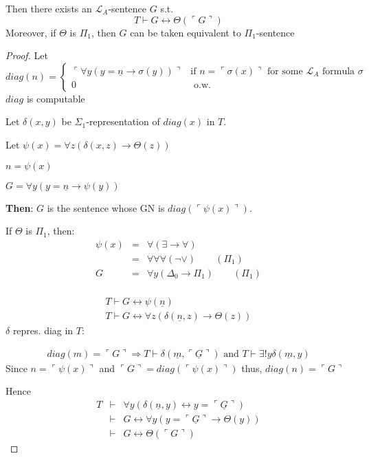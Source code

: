 \documentclass[12pt]{article}
\newcommand{\proves}{\vdash}
\newcommand{\gn}[1]{\ulcorner #1 \urcorner}
\begin{document}
Then there exists an $\mathcal{L}_A$-sentence $G$ s.t.
\[
T \proves G \leftrightarrow \Theta(\gn{G})
\]
Moreover, if $\Theta$ is $\Pi_1$, then $G$ can be taken equivalent to $\Pi_1$-sentence
\begin{proof}
  Let 
  \[
  diag(n) =
  \begin{cases}
    \gn{\forall y ( y=\underline{n} \rightarrow \sigma(y))}
   &\text{if $n = \gn{\sigma(x)}$ for some $\mathcal{L}_A$ formula $\sigma$} \\
   0 &\text{ o.w.}
  \end{cases}
  \]
  $diag$ is computable

  Let $\delta(x,y)$ be $\Sigma_1$-representation of $diag(x)$ in $T$.

  Let $\psi(x) = \forall z \left( \delta(x,z) \rightarrow \Theta(z) \right)$

  $n = \psi(x)$

  $G = \forall y \left( y = \underline{n} \rightarrow \psi(y) \right)$

  \textbf{Then}: $G$ is the sentence whose GN is $diag(\gn{\psi(x)})$.

  If $\Theta$ is $\Pi_1$, then:
  \begin{align*}
    \psi(x) &=& \forall ( \exists \rightarrow \forall) \\
            &=& \forall \forall \forall (\neg \vee) \qquad (\Pi_1) \\
            G &=&  \forall y ( \Delta_0 \rightarrow \Pi_1) \qquad (\Pi_1) \\
  \end{align*}

\begin{align}
  T \proves G \leftrightarrow \psi(\underline{n}) \\
  \label{eq:star}
  T \proves G \leftrightarrow \forall z (\delta(\underline{n}, z) \rightarrow \Theta(z))
\end{align}
$\delta$ repres. diag in $T$:

\begin{align*}
  diag(m) = 
  \gn{G} \Rightarrow T \proves \delta(\underline{m}, \underline{\gn{G}})
  \text{ and } T \proves \exists !y \delta(\underline{m},y)
\end{align*}
Since $n = \gn{\psi(x)}$ and $\gn{G} = diag(\gn{\psi(x)})$
thus, $diag(n) = \gn{G}$

Hence 
\begin{align*}
  T &\proves& \forall y \left( \delta(\underline{n}, y) \leftrightarrow
  y = \underline{\gn{G}} \right) \\
  &\proves& G \leftrightarrow \forall y (y = \underline{\gn{G}} \rightarrow \Theta(y)) \\
  &\proves& G \leftrightarrow \Theta(\gn{G})
\end{align*}
\end{proof}
\end{document}
